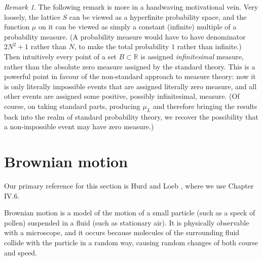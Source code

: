\documentclass[11pt]{amsart}
\theoremstyle{remark}
\newtheorem*{remark}{Remark}
\begin{document}
\begin{remark}The following remark is more in a handwaving motivational vein.
Very loosely, the lattice $S$ can be viewed as a hyperfinite probability space, and the function $\mu$ on it can be viewed as simply a constant (infinite) multiple of a probability measure.
(A probability measure would have to have denominator $2N^2+1$ rather than $N$, to make the total probability $1$ rather than infinite.)
Then intuitively every point of a set $B \subset \mathbb{R}$ is assigned \emph{infinitesimal} measure, rather than the absolute zero measure assigned by the standard theory.
This is a powerful point in favour of the non-standard approach to measure theory: now it is only literally impossible events that are assigned literally zero measure, and all other events are assigned some positive, possibly infinitesimal, measure.
(Of course, on taking standard parts, producing $\mu_L$ and therefore bringing the results back into the realm of standard probability theory, we recover the possibility that a non-impossible event may have zero measure.)
\end{remark}

\section{Brownian motion}
Our primary reference for this section is Hurd and Loeb \cite{hurdloeb}, where we use Chapter IV.6.

Brownian motion is a model of the motion of a small particle (such as a speck of pollen) suspended in a fluid (such as stationary air).
It is physically observable with a microscope, and it occurs because molecules of the surrounding fluid collide with the particle in a random way, causing random changes of both course and speed.

\
\end{document}
